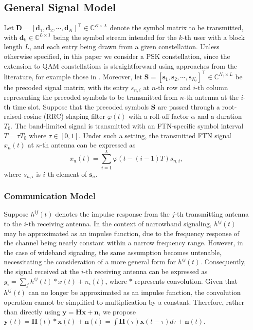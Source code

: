 \documentclass[lettersize,journal]{IEEEtran}
\newcommand{\nocolor}[1]{{\color{black}#1}}
\begin{document}
\subsection{General Signal Model}
Let $\mathbf{D}=[\mathbf{d}_1, \mathbf{d}_2, \cdots, \mathbf{d}_{K}]^{\top} \in \mathbb{C}^{K \times L}$ denote the symbol matrix to be transmitted, with \nocolor{$\mathbf{d}_k \in \mathbb{C}^{L \times 1}$} being the symbol stream intended for the $k$-th user with a block length $L$, and each entry being drawn from a given constellation. Unless otherwise specified, in this paper we consider a PSK constellation, since the extension to QAM constellations is straightforward using approaches \nocolor{from the literature, for example those in} \cite{li2020tutorial}. Moreover, let $\mathbf{S} = [\mathbf{s}_1, \mathbf{s}_2, \cdots, \mathbf{s}_{N_t}]^{\top} \in \mathbb{C}^{N_t \times L}$ be the precoded signal matrix, with its entry $s_{n,i}$ at $n$-th row and $i$-th column representing the precoded symbols to be transmitted from $n$-th antenna at the $i$-th time slot. Suppose that the precoded symbols $\mathbf{S}$ are passed through a root-raised-cosine (RRC) shaping filter $\varphi(t)$ with a roll-off factor $\alpha$ and a duration $T_0$. The band-limited signal is transmitted with an FTN-specific symbol interval $T = \tau T_0$ where $\tau \in [0,1]$. Under such a setting, the transmitted FTN signal $x_n(t)$ at $n$-th antenna can be expressed as
\begin{equation}
    x_n(t) = \sum_{i=1}^{L}\varphi(t-(i-1)T)s_{n,i},
\end{equation}
where $s_{n,i}$ is $i$-th element of $\mathbf{s}_n$.

\subsubsection{Communication Model}
\nocolor{Suppose $h^{ij}(t)$ denotes the impulse response from the $j$-th transmitting antenna to the $i$-th receiving antenna. In the context of narrowband signaling, $h^{ij}(t)$ may be approximated as an impulse function, due to the frequency response of the channel being nearly constant within a narrow frequency range. However, in the case of wideband signaling, the same assumption becomes untenable, necessitating the consideration of a more general form for $h^{ij}(t)$. Consequently, the signal received at the $i$-th receiving antenna can be expressed as $y_i = \sum_j h^{ij}(t)*x(t) + n_i(t)$, where $*$ represents convolution. Given that $h^{ij}(t)$ can no longer be approximated as an impulse function, the convolution operation cannot be simplified to multiplication by a constant. Therefore, rather than directly using $\mathbf{y} = \mathbf{H}\mathbf{x} + \mathbf{n}$, we propose $\mathbf{y}(t) = \mathbf{H}(t) * \mathbf{x}(t) + \mathbf{n}(t) = \int \mathbf{H}(\tau)\mathbf{x}(t-\tau)d\tau + \mathbf{n}(t)$.}
\end{document}
